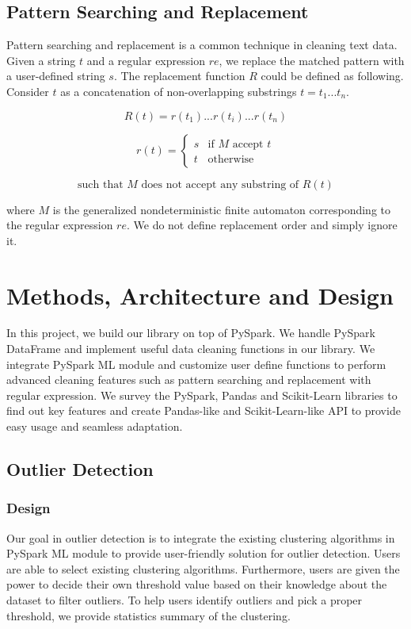 \documentclass[sigconf]{acmart}
\begin{document}
\subsection{Pattern Searching and Replacement}
Pattern searching and replacement is a common technique in cleaning text data. Given a string $t$ and a regular expression\cite{theory_com} $re$, we replace the matched pattern with a user-defined string $s$. The replacement function $R$ could be defined as following.
Consider $t$ as a concatenation of non-overlapping substrings $t = t_1...t_n$.

\[ R(t) =  r(t_1)...r(t_i)...r(t_n)\]

\[r(t) = \begin{cases} s & \text{if $M$ accept $t$} \\ t & \text{otherwise} \end{cases}\]

\[\text{such that $M$ does not accept any substring of } R(t)\]

where $M$ is the generalized nondeterministic finite automaton\cite{theory_com} corresponding to the regular expression $re$. We do not define replacement order and simply ignore it.


\section{Methods, Architecture and Design}
In this project, we build our library on top of PySpark. We handle PySpark DataFrame and implement useful data cleaning functions in our library. We integrate PySpark ML module and customize user define functions to perform advanced cleaning features such as pattern searching and replacement with regular expression. We survey the PySpark\cite{pyspark}, Pandas\cite{pandas} and Scikit-Learn\cite{scikit-learn} libraries to find out key features and create Pandas-like and Scikit-Learn-like API to provide easy usage and seamless adaptation.

\subsection{Outlier Detection}
\subsubsection{Design} 
Our goal in outlier detection is to integrate the existing clustering algorithms in PySpark ML module to provide user-friendly solution for outlier detection. Users are able to select existing clustering algorithms. Furthermore, users are given the power to decide their own threshold value based on their knowledge about the dataset to filter outliers. To help users identify outliers and pick a proper threshold, we provide statistics summary of the clustering. 
\end{document}
